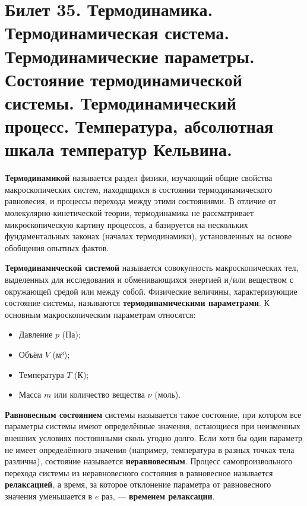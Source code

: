 \section{Билет 35. Термодинамика. Термодинамическая система. Термодинамические параметры. Состояние термодинамической системы. Термодинамический процесс. Температура, абсолютная шкала температур Кельвина.}

\begin{definition}
\textbf{Термодинамикой} называется раздел физики, изучающий общие свойства макроскопических систем, находящихся в состоянии термодинамического равновесия, и процессы перехода между этими состояниями. В отличие от молекулярно-кинетической теории, термодинамика не рассматривает микроскопическую картину процессов, а базируется на нескольких фундаментальных законах (началах термодинамики), установленных на основе обобщения опытных фактов.
\end{definition}

\begin{definition}
\textbf{Термодинамической системой} называется совокупность макроскопических тел, выделенных для исследования и обменивающихся энергией и/или веществом с окружающей средой или между собой.
Физические величины, характеризующие состояние системы, называются \textbf{термодинамическими параметрами}. К основным макроскопическим параметрам относятся:
\begin{itemize}
    \item Давление $p$ (Па);
    \item Объём $V$ (м³);
    \item Температура $T$ (К);
    \item Масса $m$ или количество вещества $\nu$ (моль).
\end{itemize}
\end{definition}

\begin{definition}
\textbf{Равновесным состоянием} системы называется такое состояние, при котором все параметры системы имеют определённые значения, остающиеся при неизменных внешних условиях постоянными сколь угодно долго.
Если хотя бы один параметр не имеет определённого значения (например, температура в разных точках тела различна), состояние называется \textbf{неравновесным}. Процесс самопроизвольного перехода системы из неравновесного состояния в равновесное называется \textbf{релаксацией}, а время, за которое отклонение параметра от равновесного значения уменьшается в $e$ раз, --- \textbf{временем релаксации}.
\end{definition}

